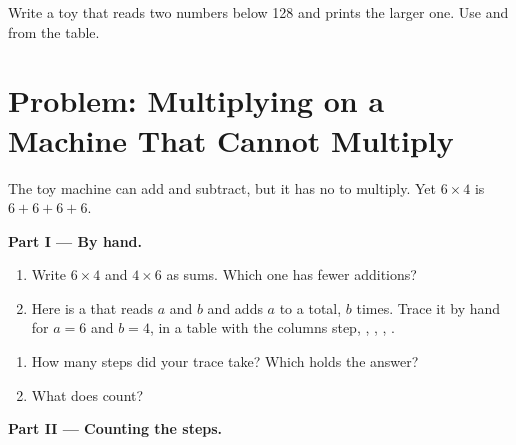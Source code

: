 \begin{exercise}[$\star\star\star$]\label{exo:g7:how-a-processor-runs-a-program:12}
Write a toy  that reads two numbers below 128 and prints the larger
one. Use  and  from the table.
\end{exercise}

\section{Problem: Multiplying on a Machine That Cannot Multiply}

\begin{problem}\label{pb:g7:how-a-processor-runs-a-program:1}
The toy machine can add and subtract, but it has no  to multiply.
Yet $6 \times 4$ is $6 + 6 + 6 + 6$.

\medskip\noindent\textbf{Part I --- By hand.}
\begin{enumerate}
  \item Write $6 \times 4$ and $4 \times 6$ as sums. Which one has fewer
    additions?
  \item Here is a  that reads $a$ and $b$ and adds $a$ to a total, $b$
    times. Trace it by hand for $a = 6$ and $b = 4$, in a table with the
    columns step, , , , .
\end{enumerate}

\label{lst:g7:how-a-processor-runs-a-program:multiply}

\begin{enumerate}[resume]
  \item How many steps did your trace take? Which  holds the answer?
  \item What does  count?
\end{enumerate}

\medskip\noindent\textbf{Part II --- Counting the steps.}

\label{lst:g7:how-a-processor-runs-a-program:multiply-steps}


\end{problem}
